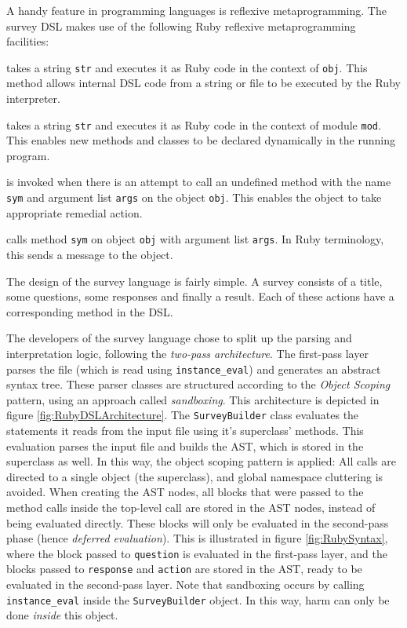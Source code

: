 A handy feature in programming languages is reflexive metaprogramming. The survey DSL makes use of the following Ruby reflexive metaprogramming facilities:

\begin{description}[align=left]

\item [obj.instance\_eval(str)] takes a string \texttt{str} and executes it as Ruby code in the context of \texttt{obj}. This method allows internal DSL code from a string or file to be executed by the Ruby interpreter.

\item [mod.class\_eval(str)] takes a string \texttt{str} and executes it as Ruby code in the context of module \texttt{mod}. This enables new methods and classes to be declared dynamically in the running program.
\item [obj.method\_missing(sym, *args)] is invoked when there is an attempt to call an undefined method with the name \texttt{sym} and argument list \texttt{args} on the object \texttt{obj}. This enables the object to take appropriate remedial action.
\item [obj.send(sym, *args)] calls method \texttt{sym} on object \texttt{obj} with argument list \texttt{args}. In Ruby terminology, this sends a message to the object.
\end{description}

The design of the survey language is fairly simple. A survey consists of a title, some questions, some responses and finally a result. Each of these actions have a corresponding method in the DSL.

The developers of the survey language chose to split up the parsing and interpretation logic, following the \textit{two-pass architecture}.
The first-pass layer parses the file (which is read using \texttt{instance\_eval}) and generates an abstract syntax tree. These parser classes are structured according to the \textit{Object Scoping} pattern\cite{DSLFowler}, using an approach called \textit{sandboxing}. This architecture is depicted in figure \ref{fig:RubyDSLArchitecture}. The \texttt{SurveyBuilder} class evaluates the statements it reads from the input file using it's superclass' methods. This evaluation parses the input file and builds the AST, which is stored in the superclass as well. In this way, the object scoping pattern is applied: All calls are directed to a single object (the superclass), and global namespace cluttering is avoided. When creating the AST nodes, all blocks that were passed to the method calls inside the top-level call are stored in the AST nodes, instead of being evaluated directly. These blocks will only be evaluated in the second-pass phase (hence \textit{deferred evaluation}). This is illustrated in figure \ref{fig:RubySyntax}, where the block passed to \texttt{question} is evaluated in the first-pass layer, and the blocks passed to \texttt{response} and \texttt{action} are stored in the AST, ready to be evaluated in the second-pass layer.
Note that sandboxing occurs by calling \texttt{instance\_eval} inside the \texttt{SurveyBuilder} object. In this way, harm can only be done \textit{inside} this object. 

